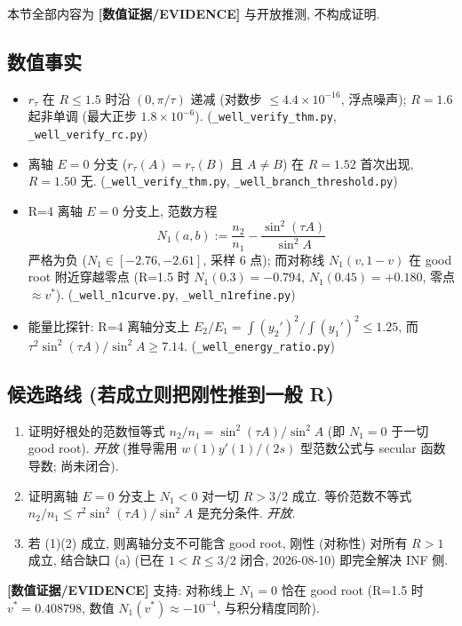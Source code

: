 \documentclass[UTF8]{ctexart}
\newcommand{\EVID}{\textbf{[数值证据/EVIDENCE]}}
\begin{document}
本节全部内容为 \EVID{} 与开放推测, 不构成证明.

\subsection{数值事实}
\begin{itemize}
	\item $r_{\tau}$ 在 $R\le1.5$ 时沿 $(0,\pi/\tau)$ 递减 (对数步 $\le4.4\times10^{-16}$,
		浮点噪声); $R=1.6$ 起非单调 (最大正步 $1.8\times10^{-6}$).
		(\texttt{\_well\_verify\_thm.py}, \texttt{\_well\_verify\_rc.py})
	\item 离轴 $E=0$ 分支 ($r_{\tau}(A)=r_{\tau}(B)$ 且 $A\ne B$)
		在 $R=1.52$ 首次出现, $R=1.50$ 无. (\texttt{\_well\_verify\_thm.py},
		\texttt{\_well\_branch\_threshold.py})
	\item R=4 离轴 $E=0$ 分支上, 范数方程
		\begin{equation}
			N_1(a,b):=\frac{n_2}{n_1}-\frac{\sin^2(\tau A)}{\sin^2 A}
		\end{equation}
		严格为负 ($N_1\in[-2.76,-2.61]$, 采样 6 点);
		而对称线 $N_1(v,1-v)$ 在 good root 附近穿越零点 (R=1.5 时
		$N_1(0.3)=-0.794$, $N_1(0.45)=+0.180$, 零点 $\approx v^*$).
		(\texttt{\_well\_n1curve.py}, \texttt{\_well\_n1refine.py})
	\item 能量比探针: R=4 离轴分支上 $E_2/E_1=\int(y_2')^2/\int(y_1')^2\le1.25$,
		而 $\tau^2\sin^2(\tau A)/\sin^2A\ge7.14$. (\texttt{\_well\_energy\_ratio.py})
\end{itemize}

\subsection{候选路线 (若成立则把刚性推到一般 R)}
\begin{enumerate}
	\item 证明好根处的范数恒等式 $n_2/n_1=\sin^2(\tau A)/\sin^2A$
		(即 $N_1=0$ 于一切 good root). \emph{开放} (推导需用 $w(1)y'(1)/(2s)$
		型范数公式与 secular 函数导数; 尚未闭合).
	\item 证明离轴 $E=0$ 分支上 $N_1<0$ 对一切 $R>3/2$ 成立.
		等价范数不等式 $n_2/n_1\le\tau^2\sin^2(\tau A)/\sin^2A$ 是充分条件.
		\emph{开放}.
	\item 若 (1)(2) 成立, 则离轴分支不可能含 good root, 刚性 (对称性) 对所有
		$R>1$ 成立, 结合缺口 (a) (已在 $1<R\le3/2$ 闭合, 2026-08-10) 即完全解决 INF 侧.
\end{enumerate}
\EVID{} 支持: 对称线上 $N_1=0$ 恰在 good root (R=1.5 时
$v^*=0.408798$, 数值 $N_1(v^*)\approx-10^{-4}$, 与积分精度同阶).
\end{document}
